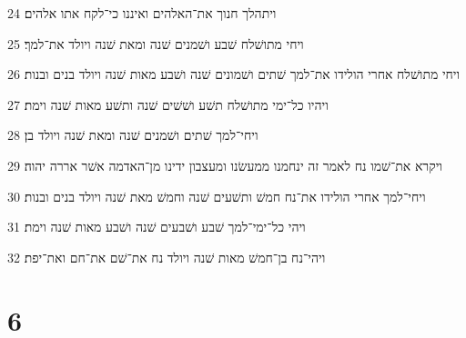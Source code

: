 \par 24 ויתהלך חנוך את־האלהים ואיננו כי־לקח אתו אלהים׃
\par 25 ויחי מתושׁלח שׁבע ושׁמנים שׁנה ומאת שׁנה ויולד את־למך׃
\par 26 ויחי מתושׁלח אחרי הולידו את־למך שׁתים ושׁמונים שׁנה ושׁבע מאות שׁנה ויולד בנים ובנות׃
\par 27 ויהיו כל־ימי מתושׁלח תשׁע ושׁשׁים שׁנה ותשׁע מאות שׁנה וימת׃
\par 28 ויחי־למך שׁתים ושׁמנים שׁנה ומאת שׁנה ויולד בן׃
\par 29 ויקרא את־שׁמו נח לאמר זה ינחמנו ממעשׂנו ומעצבון ידינו מן־האדמה אשׁר אררה יהוה׃
\par 30 ויחי־למך אחרי הולידו את־נח חמשׁ ותשׁעים שׁנה וחמשׁ מאת שׁנה ויולד בנים ובנות׃
\par 31 ויהי כל־ימי־למך שׁבע ושׁבעים שׁנה ושׁבע מאות שׁנה וימת׃
\par 32 ויהי־נח בן־חמשׁ מאות שׁנה ויולד נח את־שׁם את־חם ואת־יפת׃

\chapter{6}

